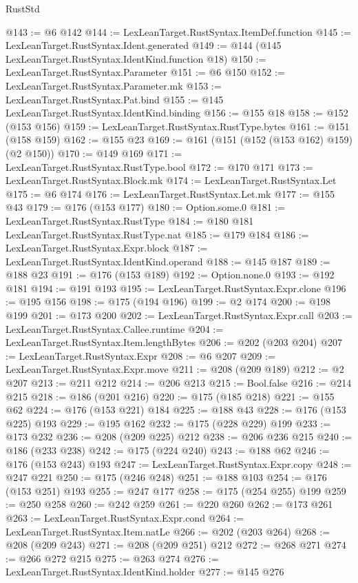 \begin{lexlean}{RustStd}
\begin{coremodule}
{\begin{coremodule}
{{{{{@143 := @6 @142
@144 := LexLeanTarget.RustSyntax.ItemDef.function
@145 := LexLeanTarget.RustSyntax.Ident.generated
@149 := @144 (@145 LexLeanTarget.RustSyntax.IdentKind.function @18)
@150 := LexLeanTarget.RustSyntax.Parameter
@151 := @6 @150
@152 := LexLeanTarget.RustSyntax.Parameter.mk
@153 := LexLeanTarget.RustSyntax.Pat.bind
@155 := @145 LexLeanTarget.RustSyntax.IdentKind.binding
@156 := @155 @18
@158 := @152 (@153 @156)
@159 := LexLeanTarget.RustSyntax.RustType.bytes
@161 := @151 (@158 @159)
@162 := @155 @23
@169 := @161 (@151 (@152 (@153 @162) @159) (@2 @150))
@170 := @149 @169
@171 := LexLeanTarget.RustSyntax.RustType.bool
@172 := @170 @171
@173 := LexLeanTarget.RustSyntax.Block.mk
@174 := LexLeanTarget.RustSyntax.Let
@175 := @6 @174
@176 := LexLeanTarget.RustSyntax.Let.mk
@177 := @155 @43
@179 := @176 (@153 @177)
@180 := Option.some.{0}
@181 := LexLeanTarget.RustSyntax.RustType
@184 := @180 @181 LexLeanTarget.RustSyntax.RustType.nat
@185 := @179 @184
@186 := LexLeanTarget.RustSyntax.Expr.block
@187 := LexLeanTarget.RustSyntax.IdentKind.operand
@188 := @145 @187
@189 := @188 @23
@191 := @176 (@153 @189)
@192 := Option.none.{0}
@193 := @192 @181
@194 := @191 @193
@195 := LexLeanTarget.RustSyntax.Expr.clone
@196 := @195 @156
@198 := @175 (@194 @196)
@199 := @2 @174
@200 := @198 @199
@201 := @173 @200
@202 := LexLeanTarget.RustSyntax.Expr.call
@203 := LexLeanTarget.RustSyntax.Callee.runtime
@204 := LexLeanTarget.RustSyntax.Item.lengthBytes
@206 := @202 (@203 @204)
@207 := LexLeanTarget.RustSyntax.Expr
@208 := @6 @207
@209 := LexLeanTarget.RustSyntax.Expr.move
@211 := @208 (@209 @189)
@212 := @2 @207
@213 := @211 @212
@214 := @206 @213
@215 := Bool.false
@216 := @214 @215
@218 := @186 (@201 @216)
@220 := @175 (@185 @218)
@221 := @155 @62
@224 := @176 (@153 @221) @184
@225 := @188 @43
@228 := @176 (@153 @225) @193
@229 := @195 @162
@232 := @175 (@228 @229) @199
@233 := @173 @232
@236 := @208 (@209 @225) @212
@238 := @206 @236 @215
@240 := @186 (@233 @238)
@242 := @175 (@224 @240)
@243 := @188 @62
@246 := @176 (@153 @243) @193
@247 := LexLeanTarget.RustSyntax.Expr.copy
@248 := @247 @221
@250 := @175 (@246 @248)
@251 := @188 @103
@254 := @176 (@153 @251) @193
@255 := @247 @177
@258 := @175 (@254 @255) @199
@259 := @250 @258
@260 := @242 @259
@261 := @220 @260
@262 := @173 @261
@263 := LexLeanTarget.RustSyntax.Expr.cond
@264 := LexLeanTarget.RustSyntax.Item.natLe
@266 := @202 (@203 @264)
@268 := @208 (@209 @243)
@271 := @208 (@209 @251) @212
@272 := @268 @271
@274 := @266 @272 @215
@275 := @263 @274
@276 := LexLeanTarget.RustSyntax.IdentKind.holder
@277 := @145 @276
}}}}}
\end{coremodule}}
\end{coremodule}
\end{lexlean}
